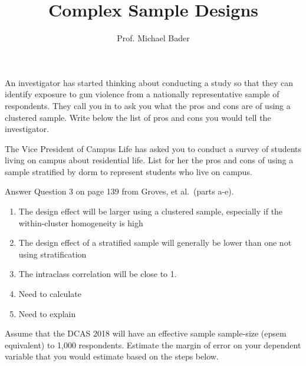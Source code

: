 \documentclass[11pt]{homework}
\title{Complex Sample Designs}
\author{Prof. Michael Bader}
\begin{document}
\maketitle 

\begin{questions}

\question[2] An investigator has started thinking about conducting a study so that they can identify exposure to gun violence from a nationally representative sample of respondents. They call you in to ask you what the pros and cons are of using a clustered sample. Write below the list of pros and cons you would tell the investigator. 

\question[2] The Vice President of Campus Life has asked you to conduct a survey of students living on campus about residential life. List for her the pros and cons of using a sample stratified by dorm to represent students who live on campus. 

\question[5] Answer Question 3 on page 139 from Groves, et al.\ (parts a-e). 
\begin{solution}
\begin{enumerate}[label=\alph*]
\item The design effect will be larger using a clustered sample, especially if the within-cluster homogeneity is high
\item The design effect of a stratified sample will generally be lower than one not using stratification
\item The intraclass correlation will be close to 1. 
\item Need to calculate
\item Need to explain 
\end{enumerate}
\end{solution}

\question Assume that the DCAS 2018 will have an effective sample sample-size (epsem equivalent) to 1,000 respondents. Estimate the margin of error on your dependent variable that you would estimate based on the steps below. 
\end{questions}
\end{document}
